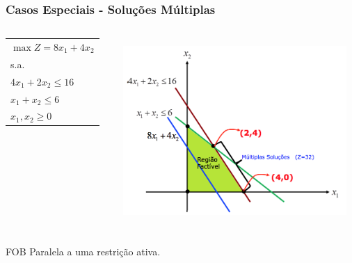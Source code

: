 \documentclass{beamer}
\begin{document}
\begin{frame}
	\frametitle{Casos Especiais - Soluções Múltiplas}
	\centering
	\begin{columns}
		\begin{column}{0.3\textwidth}
			\begin{mdframed}[backgroundcolor=blue!20] 
				\scriptsize
				\begin{tabular}{l}
				$\max Z = 8x_1 + 4x_2$ \\
				s.a. \\
				$4x_1+2x_2 \le 16$ \\
				$x_1+x_2 \le 6$ \\
				$x_1, x_2 \ge 0 $ \\
				\end{tabular}
			\end{mdframed}
		\end{column}
		\begin{column}{0.7\textwidth}
			\includegraphics[width=8.5cm,height=7cm]{CasosEspeciais-Multiplas.png}
		\end{column}
	\end{columns}
	{\color{red}FOB Paralela a uma restrição ativa.}
\end{frame}
\end{document}
